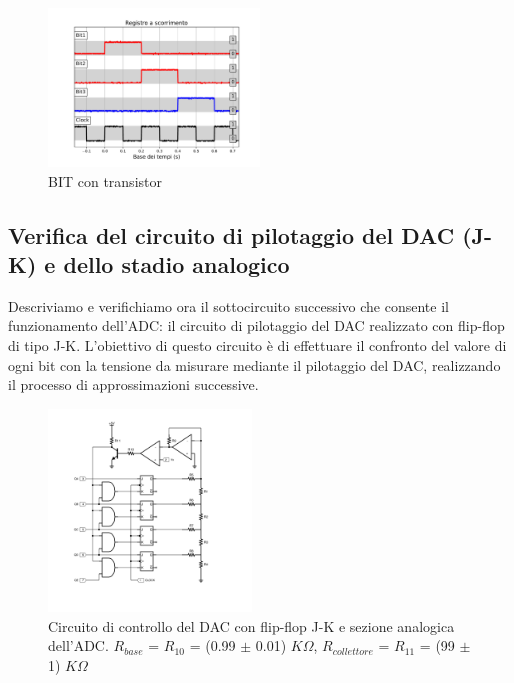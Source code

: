 \documentclass[journal]{IEEEtran}
\begin{document}
\begin{figure}[H]%
\begin{center}
\includegraphics[trim = {0 0 0 0}, clip, width=0.50\textwidth]{analysis/output/reg_test.pdf}
\caption{BIT con transistor}
\label{fig:BIT_with_transistor}
\end{center}
\end{figure}

\subsection{Verifica del circuito di pilotaggio del DAC (J-K) e dello stadio analogico}
Descriviamo e verifichiamo ora il sottocircuito successivo che consente il funzionamento dell'ADC: il circuito di pilotaggio del DAC realizzato con flip-flop di tipo J-K. L'obiettivo di questo circuito è di effettuare il confronto del valore di ogni bit con la tensione da misurare mediante il pilotaggio del DAC, realizzando il processo di approssimazioni successive. 

\begin{figure}[H]%
\begin{center}
\includegraphics[width=0.48\textwidth]{sch-simulations/digital/output/DAC.pdf}
\caption{Circuito di controllo del DAC con flip-flop J-K e sezione analogica dell'ADC. $R_{base}$ = $R_{10}$ = (0.99 $\pm$ 0.01) $K\Omega$, $R_{collettore}$ = $R_{11}$ = (99 $\pm$ 1) $K\Omega$ }
\label{fig:circuit_DAC_JK_transistor}
\end{center}
\end{figure}
\end{document}
